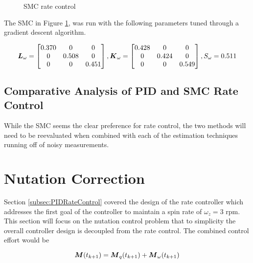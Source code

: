 \begin{figure}[H]
  \centerline{}
  \caption{SMC rate control}
  \label{fig:SMCRateControl}
\end{figure}

The SMC in Figure \ref{fig:SMCRateControl}, was run with the following parameters tuned through a gradient descent algorithm.

\begin{equation}
    \boldsymbol{L}_{\omega} = \begin{bmatrix} 0.370 & 0 & 0 \\ 0 & 0.508 & 0 \\ 0 & 0 & 0.451 \end{bmatrix},
    \boldsymbol{K}_{\omega} = \begin{bmatrix} 0.428 & 0 & 0 \\ 0 & 0.424 & 0 \\ 0 & 0 & 0.549 \end{bmatrix},
    S_{\omega} = 0.511
  \label{SMCRateControlGains}
\end{equation}

\subsection{Comparative Analysis of PID and SMC Rate Control}
\label{subsec:ComparativeAnalysisofPIDandSMCRateControl}


While the SMC seems the clear preference for rate control, the two methods will need to be reevaluated when combined with each of the estimation techniques running off of noisy measurements.

\section{Nutation Correction}
\label{sec:NutationCorrection}

Section \ref{subsec:PIDRateControl} covered the design of the rate controller which addresses the first goal of the controller to maintain a spin rate of $\omega_z = 3$ rpm.  This section will focus on the nutation control problem that to simplicity the overall controller design is decoupled from the rate control.  The combined control effort would be

\begin{equation}
    \boldsymbol{M}(t_{k+1}) = \boldsymbol{M}_{q}(t_{k+1}) + \boldsymbol{M}_{\omega}(t_{k+1})
\end{equation}

